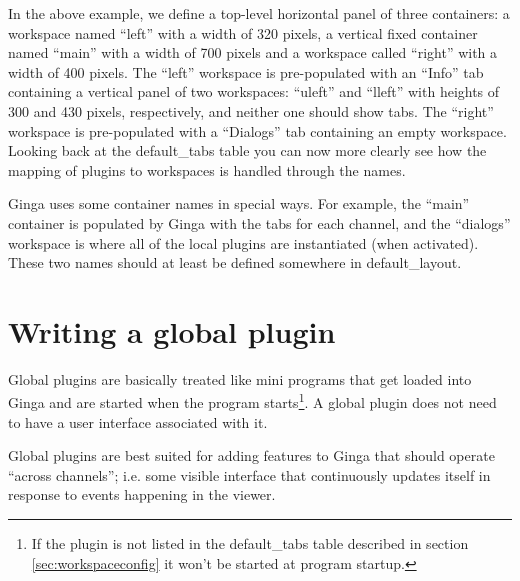 \documentclass[11pt]{report}
\begin{document}
In the above example, we define a top-level horizontal panel of three
containers: a workspace named ``left'' with a width of 320 pixels, a
vertical fixed container named ``main'' with a width of 700 pixels and a
workspace called ``right'' with a width of 400 pixels.  The ``left''
workspace is pre-populated with an ``Info'' tab containing a vertical
panel of two workspaces: ``uleft'' and ``lleft'' with heights of 300 and
430 pixels, respectively, and neither one should show tabs.  The ``right''
workspace is pre-populated with a ``Dialogs'' tab containing an empty
workspace.  Looking back at the  default\_tabs table you can now more 
clearly see how the mapping of plugins to workspaces is handled through
the names.

Ginga uses some container names in special ways.
For example, the ``main'' container is populated by Ginga with the tabs
for each channel, and the ``dialogs'' workspace is where all of the
local plugins are instantiated (when activated).
These two names should at least be defined somewhere in default\_layout.

\section{Writing a global plugin}
\label{sec:globalplugins}
Global plugins are basically treated like mini programs that get loaded
into Ginga and are started when the program starts\footnote{If the
  plugin is not listed in the default\_tabs table described in section
  \ref{sec:workspaceconfig} it won't be started at program startup.}.
A global plugin does not need to have a user interface associated with
it.  

Global plugins are best suited for adding features to Ginga that
should operate ``across channels''; i.e. some visible interface that
continuously updates itself in response to events happening in the
viewer.
\end{document}
